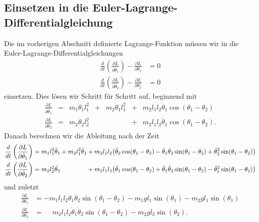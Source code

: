 \subsection{Einsetzen in die Euler-Lagrange-Differentialgleichung}
Die im vorherigen Abschnitt definierte Lagrange-Funktion müssen wir in
die Euler-Lagrange-Differentialgleichungen
\begin{align}
    \label{eq:lag1}
    \frac{d}{dt} \left(\frac{\partial L}{\partial \dot{\theta}_1}\right) 
    - \frac{\partial L}{\partial \theta_1} &= 0\\
    \label{eq:lag2}
    \frac{d}{dt} \left(\frac{\partial L}{\partial \dot{\theta}_2}\right) 
    - \frac{\partial L}{\partial \theta_2} &= 0
\end{align}
einsetzen.
Dies lösen wir Schritt für Schritt auf, beginnend mit
\begin{equation*}
\renewcommand{\arraycolsep}{1.5pt}
\begin{array}{rclclcl}
\displaystyle
\frac{\partial L}{\partial \dot{\theta}_1}
&=& m_1 \dot{\theta}_1 l_1^2
&+& m_2 \dot{\theta}_1 l_1^2
&+& m_2 l_1 l_2 \dot{\theta}_1 \cos(\theta_1-\theta_2)
\\[9pt]
\displaystyle
\frac{\partial L}{\partial \dot{\theta}_2}
&=& m_2 \dot{\theta}_2 l_2^2
& &
&+& m_2 l_1 l_2 \dot{\theta}_1 \cos(\theta_1-\theta_2).
\end{array}
\end{equation*}
Danach berechnen wir die Ableitung nach der Zeit
\begin{align*}
    \frac{d}{dt} \left(\frac{\partial L}{\partial \dot{\theta}_1}\right)
&=
    m_1 l_1^2 \ddot{\theta}_1 + m_2 l_1^2 \ddot{\theta}_1
+ m_2 l_1 l_2 \bigl(\ddot{\theta}_2\cos(\theta_1-\theta_2)-
    \dot{\theta}_1 \dot{\theta}_2 \sin(\theta_1-\theta_2)
+ \dot{\theta}_2^2 \sin(\theta_1-\theta_2)\bigr)\\
    \frac{d}{dt} \left(\frac{\partial L}{\partial \dot{\theta}_2}\right)
&=
    m_2 l_2^2 \ddot{\theta}_2
    \phantom{\mathstrut+ m_2 l_1^2 \ddot{\theta}_1}
+ m_2 l_1 l_2 \bigl(\ddot{\theta}_1\cos(\theta_1-\theta_2)+
    \dot{\theta}_1 \dot{\theta}_2 \sin(\theta_1-\theta_2)
 - \dot{\theta}_1^2 \sin(\theta_1-\theta_2)\bigr)
\end{align*}
und zuletzt
\begin{align*}
    \frac{\partial L}{\partial {\theta}_1} &= -m_1 l_1 l_2 \dot{\theta}_1
    \dot{\theta}_2 \sin(\theta_1-\theta_2) - m_1 g l_1 \sin(\theta_1)
    - m_2 g l_1 \sin(\theta_1)\\
    \frac{\partial L}{\partial {\theta}_2} &= \phantom{-}m_2 l_1 l_2 \dot{\theta}_1
    \dot{\theta}_2 \sin(\theta_1-\theta_2) - m_2 g l_2 \sin(\theta_2).
\end{align*}

